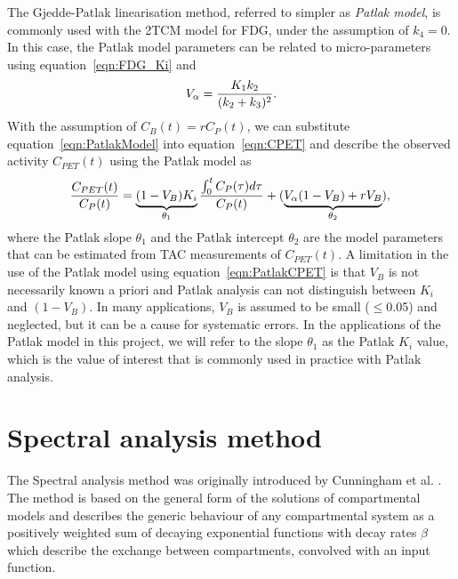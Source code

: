 The Gjedde-Patlak linearisation method, referred to simpler as \textit{Patlak model}, is commonly used with the 2TCM model for FDG, under the assumption of $k_4=0$. In this case, the Patlak model parameters can be related to micro-parameters using equation~\ref{eqn:FDG_Ki} and 
%
\begin{equation} 
V_{\alpha}  = \frac{K_1 k_2}{(k_2+k_3)^2} \\ . \\ 
\end{equation}
%
With the assumption of $C_{B}(t) = r C_{P}(t)$, we can substitute equation~\ref{eqn:PatlakModel} into equation~\ref{eqn:CPET} and describe the observed activity $C_{PET}(t)$ using the Patlak model as
%
\begin{equation} 
\frac{C_{PET}(t)}{C_{P}(t)} = \underbrace{(1-V_{B})K_i}_{\theta_1} \frac{\int_{0}^{t} C_{P}(\tau) d\tau}{ C_{P}(t)} +  (\underbrace{V_{\alpha}(1-V_{B})+r V_{B}}_{\theta_2}) \\ , \\
\label{eqn:PatlakCPET}
\end{equation}
%
where the Patlak slope $\theta_1$ and the Patlak intercept $\theta_2$ are the model parameters that can be estimated from TAC measurements of ${C_{PET}}(t)$. 
%
A limitation in the use of the Patlak model using equation~\ref{eqn:PatlakCPET} is that $V_B$ is not necessarily known a priori and Patlak analysis can not distinguish between $K_i$ and $(1-V_B)$. In many applications, $V_B$ is assumed to be small ($\leq$0.05) and neglected, but it can be a cause for systematic errors. 
In the applications of the Patlak model in this project, we will refer to the slope $\theta_1$ as the Patlak $K_i$ value, which is the value of interest that is commonly used in practice with Patlak analysis.


\section{Spectral analysis method}
The Spectral analysis method was originally introduced by Cunningham et al. \cite{Cunningham1993}. The method is based on the general form of the solutions of compartmental models and describes the generic behaviour of any compartmental system as a positively weighted sum of decaying exponential functions with decay rates $\beta$ which describe the exchange between compartments, convolved with an input function. 

